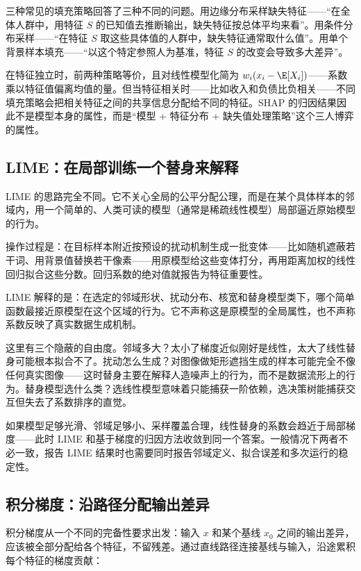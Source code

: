 三种常见的填充策略回答了三种不同的问题。用边缘分布采样缺失特征——``在全体人群中，用特征 \(S\) 的已知值去推断输出，缺失特征按总体平均来看''。用条件分布采样——``在特征 \(S\) 取这些具体值的人群中，缺失特征通常取什么值''。用单个背景样本填充——``以这个特定参照人为基准，特征 \(S\) 的改变会导致多大差异''。

在特征独立时，前两种策略等价，且对线性模型化简为 \(w_i(x_i - \E[X_i])\)——系数乘以特征值偏离均值的量。但当特征相关时——比如收入和负债比负相关——不同填充策略会把相关特征之间的共享信息分配给不同的特征。SHAP 的归因结果因此不是模型本身的属性，而是``模型 + 特征分布 + 缺失值处理策略''这个三人博弈的属性。

\subsection{LIME：在局部训练一个替身来解释}

LIME 的思路完全不同。它不关心全局的公平分配公理，而是在某个具体样本的邻域内，用一个简单的、人类可读的模型（通常是稀疏线性模型）局部逼近原始模型的行为。

操作过程是：在目标样本附近按预设的扰动机制生成一批变体——比如随机遮蔽若干词、用背景值替换若干像素——用原模型给这些变体打分，再用距离加权的线性回归拟合这些分数。回归系数的绝对值就报告为特征重要性。

LIME 解释的是：在选定的邻域形状、扰动分布、核宽和替身模型类下，哪个简单函数最接近原模型在这个区域的行为。它不声称这是原模型的全局属性，也不声称系数反映了真实数据生成机制。

这里有三个隐蔽的自由度。邻域多大？太小了梯度近似刚好是线性，太大了线性替身可能根本拟合不了。扰动怎么生成？对图像做矩形遮挡生成的样本可能完全不像任何真实图像——这时替身主要在解释人造噪声上的行为，而不是数据流形上的行为。替身模型选什么类？选线性模型意味着只能捕获一阶依赖，选决策树能捕获交互但失去了系数排序的直觉。

如果模型足够光滑、邻域足够小、采样覆盖合理，线性替身的系数会趋近于局部梯度——此时 LIME 和基于梯度的归因方法收敛到同一个答案。一般情况下两者不必一致，报告 LIME 结果时也需要同时报告邻域定义、拟合误差和多次运行的稳定性。

\subsection{积分梯度：沿路径分配输出差异}

积分梯度从一个不同的完备性要求出发：输入 \(x\) 和某个基线 \(x_0\) 之间的输出差异，应该被全部分配给各个特征，不留残差。通过直线路径连接基线与输入，沿途累积每个特征的梯度贡献：

